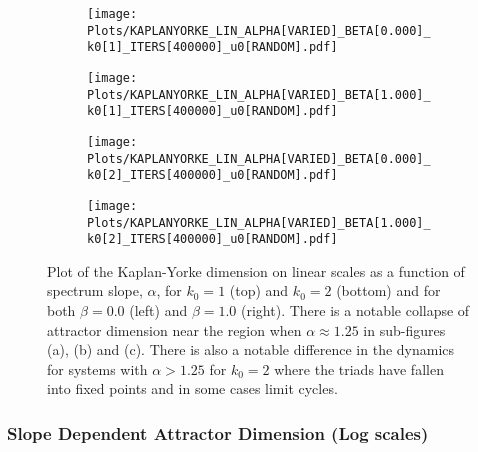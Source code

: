 \documentclass[9pt]{article}
\begin{document}
\begin{figure}[h!]
  \centering
  \begin{subfigure}[b]{0.49\linewidth}
    \texttt{[image: Plots/KAPLANYORKE\_LIN\_ALPHA[VARIED]\_BETA[0.000]\_k0[1]\_ITERS[400000]\_u0[RANDOM].pdf]}
    \caption{}
  \end{subfigure}
  \begin{subfigure}[b]{0.49\linewidth}
    \texttt{[image: Plots/KAPLANYORKE\_LIN\_ALPHA[VARIED]\_BETA[1.000]\_k0[1]\_ITERS[400000]\_u0[RANDOM].pdf]}
    \caption{}
  \end{subfigure}
  \begin{subfigure}[b]{0.49\linewidth}
    \texttt{[image: Plots/KAPLANYORKE\_LIN\_ALPHA[VARIED]\_BETA[0.000]\_k0[2]\_ITERS[400000]\_u0[RANDOM].pdf]}
    \caption{}
  \end{subfigure}
   \begin{subfigure}[b]{0.49\linewidth}
    \texttt{[image: Plots/KAPLANYORKE\_LIN\_ALPHA[VARIED]\_BETA[1.000]\_k0[2]\_ITERS[400000]\_u0[RANDOM].pdf]}
    \caption{}
  \end{subfigure}
  \caption{Plot of the Kaplan-Yorke dimension on linear scales as a function of spectrum slope, $\alpha$, for $k_0 = 1$ (top) and $k_0 = 2$ (bottom) and for both $\beta = 0.0$ (left) and $\beta = 1.0$ (right). There is a notable collapse of attractor dimension near the region when $\alpha \approx 1.25$ in sub-figures (a), (b) and (c). There is also a notable difference in the dynamics for systems with $\alpha > 1.25$ for $k_0 = 2$ where the triads have fallen into fixed points and in some cases limit cycles.}
  \label{fig:1_lin}
\end{figure}



\subsubsection*{Slope Dependent Attractor Dimension (Log scales)}
\end{document}
